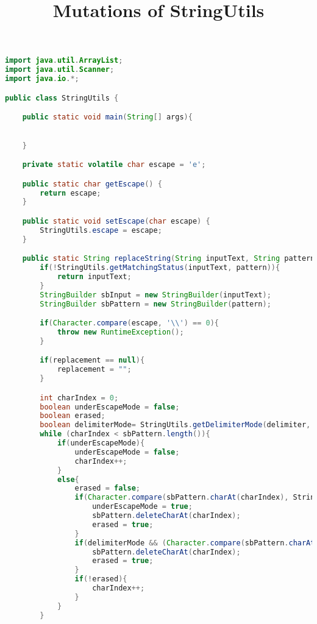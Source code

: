 \documentclass{article}
\begin{document}
\title{Mutations of StringUtils}
\date{}
\maketitle

\begin{lstlisting}[language=Java]
import java.util.ArrayList;
import java.util.Scanner;
import java.io.*;

public class StringUtils {

    public static void main(String[] args){
	

    }

    private static volatile char escape = 'e';

    public static char getEscape() {
        return escape;
    }

    public static void setEscape(char escape) {
        StringUtils.escape = escape;
    }

    public static String replaceString(String inputText, String pattern, String replacement, Character delimiter, boolean inside) throws RuntimeException{
        if(!StringUtils.getMatchingStatus(inputText, pattern)){
            return inputText;
        }
        StringBuilder sbInput = new StringBuilder(inputText);
        StringBuilder sbPattern = new StringBuilder(pattern);

        if(Character.compare(escape, '\\') == 0){
            throw new RuntimeException();
        }

        if(replacement == null){
            replacement = "";
        }

        int charIndex = 0;
        boolean underEscapeMode = false;
        boolean erased;
        boolean delimiterMode= StringUtils.getDelimiterMode(delimiter, inside);
        while (charIndex < sbPattern.length()){
            if(underEscapeMode){
                underEscapeMode = false;
                charIndex++;
            }
            else{
                erased = false;
                if(Character.compare(sbPattern.charAt(charIndex), StringUtils.getEscape()) == 0){
                    underEscapeMode = true;
                    sbPattern.deleteCharAt(charIndex);
                    erased = true;
                }
                if(delimiterMode && (Character.compare(sbPattern.charAt(charIndex), delimiter) == 0) && !underEscapeMode){
                    sbPattern.deleteCharAt(charIndex);
                    erased = true;
                }
                if(!erased){
                    charIndex++;
                }
            }
        }


\end{lstlisting}
\end{document}
